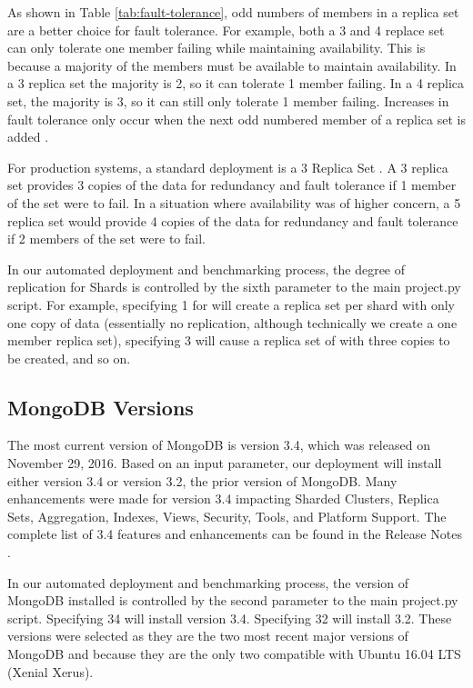 \documentclass[9pt,twocolumn,twoside]{../../styles/osajnl}
\begin{document}
As shown in Table \ref{tab:fault-tolerance}, odd numbers of members in a replica set are a better choice for fault tolerance. For example, both a 3 and 4 replace set can only tolerate one member failing while maintaining availability.  This is because a majority of the members must be available to maintain availability.  In a 3 replica set the majority is 2, so it can tolerate 1 member failing.  In a 4 replica set, the majority is 3, so it can still only tolerate 1 member failing.  Increases in fault tolerance only occur when the next odd numbered member of a replica set is added  \cite{www-mongoRepDep}.

For production systems, a standard deployment is a 3 Replica Set  \cite{www-mongoRepDep}.  A 3 replica set provides 3 copies of the data for redundancy and fault tolerance if 1 member of the set were to fail.  In a situation where availability was of higher concern, a 5 replica set would provide 4 copies of the data for redundancy and fault tolerance if 2 members of the set were to fail.

In our automated deployment and benchmarking process, the degree of replication for Shards is controlled by the sixth parameter to the main project.py script. For example, specifying 1 for will create a replica set per shard with only one copy of data (essentially no replication, although technically we create a one member replica set), specifying 3 will cause a replica set of with three copies to be created, and so on.

\subsection{MongoDB Versions}

The most current version of MongoDB is version 3.4, which was released on November 29, 2016.  Based on an input parameter, our deployment will install either version 3.4 or version 3.2, the prior version of MongoDB.  Many enhancements were made for version 3.4 impacting Sharded Clusters, Replica Sets, Aggregation, Indexes, Views, Security, Tools, and Platform Support.  The complete list of 3.4 features and enhancements can be found in the Release Notes \cite{www-mongoRelease}.

In our automated deployment and benchmarking process, the version of MongoDB installed is controlled by the second parameter to the main project.py script. Specifying 34 will install version 3.4.  Specifying 32 will install 3.2.  These versions were selected as they are the two most recent major versions of MongoDB and because they are the only two compatible with Ubuntu 16.04 LTS (Xenial Xerus).
\end{document}
